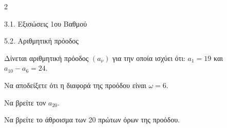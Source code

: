 \begin{ylh}{2}
    \item 3.1. Εξισώσεις 1ου Βαθμού
    \item 5.2. Αριθμητική πρόοδος
\end{ylh}
Δίνεται αριθμητική πρόοδος $(a_\nu)$ για την οποία ισχύει ότι: $a_1 = 19$ και $a_{10} - a_6 = 24$.

\begin{alist}
\item Να αποδείξετε ότι η διαφορά της προόδου είναι $\omega = 6$.
\item Να βρείτε τον $a_{20}$.
\item Να βρείτε το άθροισμα των 20 πρώτων όρων της προόδου.
\end{alist}

